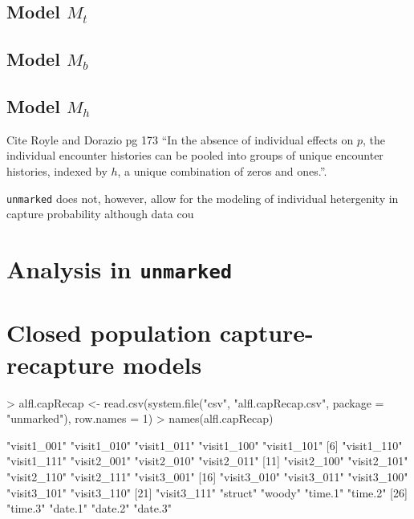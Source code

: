 \documentclass[a4paper]{article}
\renewenvironment{Schunk}{\vspace{\topsep}}{\vspace{\topsep}}
\begin{document}
\subsection{Model $M_t$}





\subsection{Model $M_b$}




\subsection{Model $M_h$}

Cite Royle and Dorazio pg 173 ``In the absence of individual effects
on $p$, the individual encounter histories can be pooled into groups
of unique encounter histories, indexed by $h$, a unique combination of
zeros and ones.''.

{\tt unmarked} does not, however, allow for the modeling of individual
  hetergenity in capture probability although data cou


\section{Analysis in {\tt unmarked}}




\section{Closed population capture-recapture models}




\begin{Schunk}
\begin{Sinput}
> alfl.capRecap <- read.csv(system.file("csv", "alfl.capRecap.csv", 
     package = "unmarked"), row.names = 1)
> names(alfl.capRecap)
\end{Sinput}
\begin{Soutput}
 [1] "visit1_001" "visit1_010" "visit1_011" "visit1_100" "visit1_101"
 [6] "visit1_110" "visit1_111" "visit2_001" "visit2_010" "visit2_011"
[11] "visit2_100" "visit2_101" "visit2_110" "visit2_111" "visit3_001"
[16] "visit3_010" "visit3_011" "visit3_100" "visit3_101" "visit3_110"
[21] "visit3_111" "struct"     "woody"      "time.1"     "time.2"    
[26] "time.3"     "date.1"     "date.2"     "date.3"    
\end{Soutput}
\end{Schunk}
\end{document}
